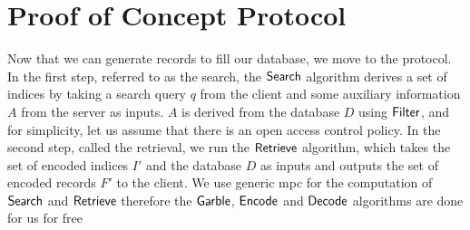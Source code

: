\section{Proof of Concept Protocol}
\label{sec:proofofconceptProtocol}

Now that we can generate records to fill our database, we move to the protocol. In the first step, referred to as the search, the $ \mathsf{{Search}} $ algorithm derives a set of indices by taking a search query $ q $ from the client and some auxiliary information $ A $ from the server as inputs. $ A $ is derived from the database $ D $ using $ \mathsf{{Filter}} $, and for simplicity, let us assume that there is an open access control policy. In the second step, called the retrieval, we run the $ \mathsf{{Retrieve}} $ algorithm, which takes the set of encoded indices $ I' $ and the database $ D $ as inputs and outputs the set of encoded records $ F' $ to the client. We use generic \acrshort{mpc} for the computation of $ \mathsf{{Search}} $ and $ \mathsf{{Retrieve}} $ therefore the $ \mathsf{{Garble}} $, $ \mathsf{{Encode}}$ and $ \mathsf{{Decode}} $ algorithms are done for us for free

